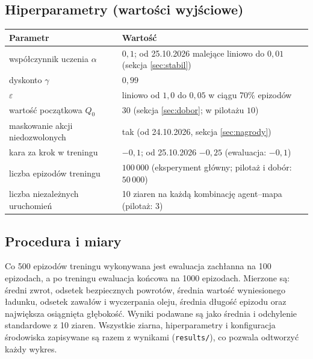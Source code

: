 \documentclass[11pt,a4paper]{article}
\begin{document}
\subsection{Hiperparametry (wartości wyjściowe)}
\begin{center}
\begin{tabular}{@{}ll@{}}
\toprule
Parametr & Wartość \\
\midrule
współczynnik uczenia $\alpha$ & $0{,}1$; od 25.10.2026 malejące liniowo do $0{,}01$ (sekcja \ref{sec:stabil}) \\
dyskonto $\gamma$ & $0{,}99$ \\
$\varepsilon$ & liniowo od $1{,}0$ do $0{,}05$ w ciągu 70\% epizodów \\
wartość początkowa $Q_0$ & $30$ (sekcja \ref{sec:dobor}; w pilotażu $10$) \\
maskowanie akcji niedozwolonych & tak (od 24.10.2026, sekcja \ref{sec:nagrody}) \\
kara za krok w treningu & $-0{,}1$; od 25.10.2026 $-0{,}25$ (ewaluacja: $-0{,}1$) \\
liczba epizodów treningu & $100\,000$ (eksperyment główny; pilotaż i dobór: $50\,000$) \\
liczba niezależnych uruchomień & 10 ziaren na każdą kombinację agent--mapa (pilotaż: 3) \\
\bottomrule
\end{tabular}
\end{center}

\subsection{Procedura i miary}
Co 500 epizodów treningu wykonywana jest ewaluacja zachłanna na 100 epizodach,
a po treningu ewaluacja końcowa na 1000 epizodach. Mierzone są: średni zwrot,
odsetek bezpiecznych powrotów, średnia wartość wyniesionego ładunku, odsetek
zawałów i wyczerpania oleju, średnia długość epizodu oraz największa osiągnięta
głębokość. Wyniki podawane są jako średnia i odchylenie standardowe z 10 ziaren.
Wszystkie ziarna, hiperparametry i konfiguracja środowiska zapisywane są razem
z wynikami (\texttt{results/}), co pozwala odtworzyć każdy wykres.
\end{document}
